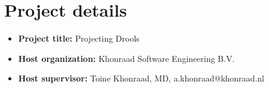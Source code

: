 \section*{Project details}

\begin{itemize}
    \item \textbf{Project title:} Projecting Drools
    \item \textbf{Host organization:} Khonraad Software Engineering B.V. 
    \item \textbf{Host supervisor:} Toine Khonraad, MD, a.khonraad@khonraad.nl
\end{itemize}
